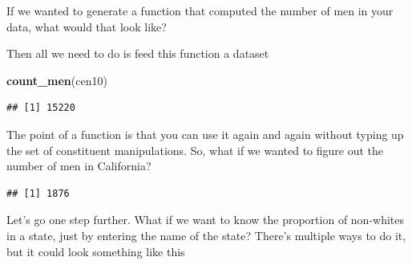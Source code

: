 \documentclass[]{book}
\newenvironment{Shaded}{\begin{snugshade}}{\end{snugshade}}
\newcommand{\ControlFlowTok}[1]{\textcolor[rgb]{0.13,0.29,0.53}{\textbf{#1}}}
\newcommand{\KeywordTok}[1]{\textcolor[rgb]{0.13,0.29,0.53}{\textbf{#1}}}
\newcommand{\NormalTok}[1]{#1}
\newcommand{\OperatorTok}[1]{\textcolor[rgb]{0.81,0.36,0.00}{\textbf{#1}}}
\newcommand{\StringTok}[1]{\textcolor[rgb]{0.31,0.60,0.02}{#1}}
\theoremstyle{definition}
\theoremstyle{definition}
\theoremstyle{definition}
\theoremstyle{remark}
\begin{document}
If we wanted to generate a function that computed the number of men in your data, what would that look like?

\begin{Shaded}
\end{Shaded}

Then all we need to do is feed this function a dataset

\begin{Shaded}
\begin{Highlighting}[]
\KeywordTok{count_men}\NormalTok{(cen10)}
\end{Highlighting}
\end{Shaded}

\begin{verbatim}
## [1] 15220
\end{verbatim}

The point of a function is that you can use it again and again without typing up the set of constituent manipulations. So, what if we wanted to figure out the number of men in California?

\begin{Shaded}
\end{Shaded}

\begin{verbatim}
## [1] 1876
\end{verbatim}

Let's go one step further. What if we want to know the proportion of non-whites in a state, just by entering the name of the state? There's multiple ways to do it, but it could look something like this

\begin{Shaded}
\end{Shaded}
\end{document}
